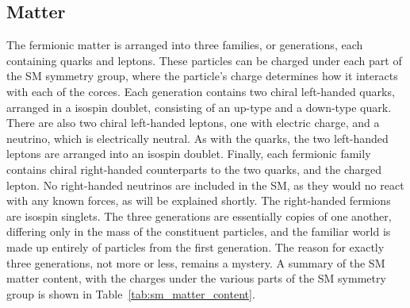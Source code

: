 \subsection{Matter}
\label{sec:matter}

The fermionic matter is arranged into three families, or generations, each
containing quarks and leptons.
These particles can be charged under each part of the SM symmetry group,
where the particle's charge determines how it interacts with each of the
corces.
Each generation contains two chiral left-handed quarks, arranged in a isospin
doublet, consisting of an up-type and a down-type quark.
There are also two chiral left-handed leptons, one with electric charge, and
a neutrino, which is electrically neutral.
As with the quarks, the two left-handed leptons are arranged into an isospin
doublet.
Finally, each fermionic family contains chiral right-handed counterparts to
the two quarks, and the charged lepton.
No right-handed neutrinos are included in the SM, as they would no react with
any known forces, as will be explained shortly.
The right-handed fermions are isospin singlets.
The three generations are essentially copies of one another, differing only in
the mass of the constituent particles, and the familiar world is made up
entirely of particles from the first generation.
The reason for exactly three generations, not more or less, remains a mystery.
A summary of the SM matter content, with the charges under the various
parts of the SM symmetry group is shown in Table~\ref{tab:sm_matter_content}.

